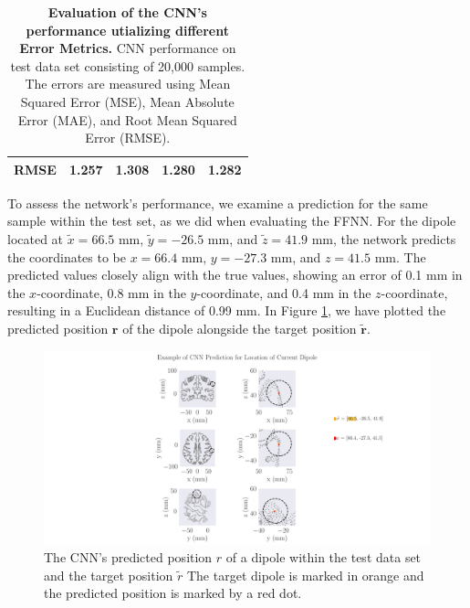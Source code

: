 \documentclass[a4paper, UKenglish, 11pt]{uiomaster}
\begin{document}
\begin{table}[!htb]
\begin{tabular}{l|cccc|}
\multicolumn{1}{|l|}{\cellcolor[HTML]{EFEFEF}RMSE} & \multicolumn{1}{c|}{1.257}                                                                                  & \multicolumn{1}{c|}{1.308}                                                                                   & \multicolumn{1}{c|}{1.280}                                                                                   & 1.282                                                                                                              \\ \hline
\end{tabular}
\caption{\textbf{Evaluation of the CNN's performance utializing different Error Metrics.} \newline
CNN performance on test data set consisting of 20,000 samples. The errors are measured using Mean Squared Error (MSE), Mean Absolute Error (MAE), and Root Mean Squared Error (RMSE).}
\label{table:error_simple_dipole}
\end{table}


To assess the network's performance, we examine a prediction for the same sample within the test set, as we did when evaluating the FFNN. For the dipole located at $\tilde{x} = 66.5$ mm, $\tilde{y} = -26.5$ mm, and $\tilde{z} = 41.9$ mm, the network predicts the coordinates to be $x = 66.4$ mm, $y = -27.3$ mm, and $z = 41.5$ mm. The predicted values closely align with the true values, showing an error of 0.1 mm in the $x$-coordinate, 0.8 mm in the $y$-coordinate, and 0.4 mm in the $z$-coordinate, resulting in a Euclidean distance of 0.99 mm. In Figure \ref{fig:prediction_example}, we have plotted the predicted position $\mathbf{r}$ of the dipole alongside the target position $\mathbf{\tilde{r}}$.

\begin{figure}
  \hspace*{-1.5cm}
  \includegraphics[width=18cm]{figures/CNN/single_dipole_prediction.pdf}
  \caption{The CNN's predicted position $r$ of a dipole within the test data set and the target position $\tilde{r}$ The target dipole is marked in orange and the predicted position is marked by a red dot.}
  \label{fig:prediction_example}
\end{figure}
\end{document}
